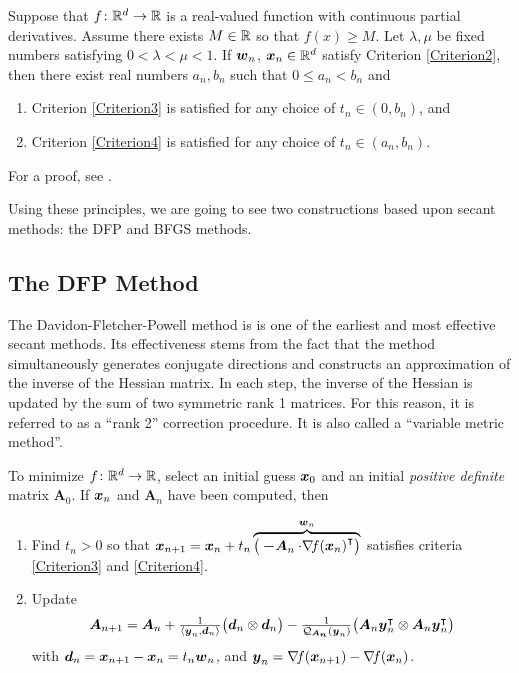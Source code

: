\begin{theorem}[Wolfe]\label{theorem:Wolfe}
Suppose that $f \colon \mathbb{R}^d \to \mathbb{R}$ is a real-valued function with continuous partial derivatives.  Assume there exists $M \in \mathbb{R}$ so that $f(x) \geq M$.  Let $\lambda, \mu$ be fixed numbers satisfying $0 < \lambda < \mu < 1$.  If $\boldsymbol{w}_n$, $\boldsymbol{x}_n \in \mathbb{R}^d$ satisfy Criterion \eqref{Criterion2}, then there exist real numbers $a_n, b_n$ such that $0 \leq a_n < b_n$ and
\begin{enumerate}
	\item Criterion \eqref{Criterion3} is satisfied for any choice of $t_n \in (0, b_n)$, and
	\item Criterion \eqref{Criterion4} is satisfied for any choice of $t_n \in (a_n, b_n)$.
\end{enumerate}
\end{theorem}

\begin{remark}
For a proof, see \cite[Theorem 3.3.1]{peressini1988mathematics}.
\end{remark}

Using these principles, we are going to see two constructions based upon secant methods: the DFP and BFGS methods.

\subsection{The DFP Method}
The Davidon-Fletcher-Powell method is is one of the earliest and most effective secant methods. Its effectiveness stems from the fact that the method simultaneously generates conjugate directions and constructs an approximation of the inverse of the Hessian matrix. In each step, the inverse of the Hessian is updated by the sum of two symmetric rank 1 matrices. For this reason, it is referred to as a “rank 2” correction procedure. It is also called a “variable metric method”.

To minimize $f \colon \mathbb{R}^d \to \mathbb{R}$, select an initial guess $\boldsymbol{x}_0$ and an initial \emph{positive definite} matrix $\boldsymbol{A}_0$.  If $\boldsymbol{x}_n$ and $\boldsymbol{A}_n$ have been computed, then 
\begin{enumerate}
	\item Find $t_n>0$ so that $\boldsymbol{x}_{n+1} = \boldsymbol{x}_n + t_n \overbrace{\big( \boldsymbol{-A}_n \cdot {\mathop{\nabla\! {f}}(\boldsymbol{x}_n)}^\intercal\big)}^{\boldsymbol{w}_n}$ satisfies criteria \eqref{Criterion3} and \eqref{Criterion4}.
	\item Update
	\begin{equation}\label{equation:DFP}
	\boldsymbol{A}_{n+1} = \boldsymbol{A}_n + \tfrac{1}{\langle \boldsymbol{y}_n, \boldsymbol{d}_n \rangle} \big( \boldsymbol{d}_n \otimes \boldsymbol{d}_n \big) - \tfrac{1}{\mathcal{Q}_{\boldsymbol{\boldsymbol{A}_n}}(\boldsymbol{y}_n)} \big( \boldsymbol{A}_n {\boldsymbol{y}}^\intercal_n \otimes \boldsymbol{A}_n {\boldsymbol{y}}^\intercal_n \big)
	\end{equation}
	with $\boldsymbol{d}_n = \boldsymbol{x}_{n+1}-\boldsymbol{x}_n= t_n\boldsymbol{w}_n$, and $\boldsymbol{y}_n = \mathop{\nabla\! {f}}(\boldsymbol{x}_{n+1}) - \mathop{\nabla\! {f}}(\boldsymbol{x}_n)$.
\end{enumerate}

